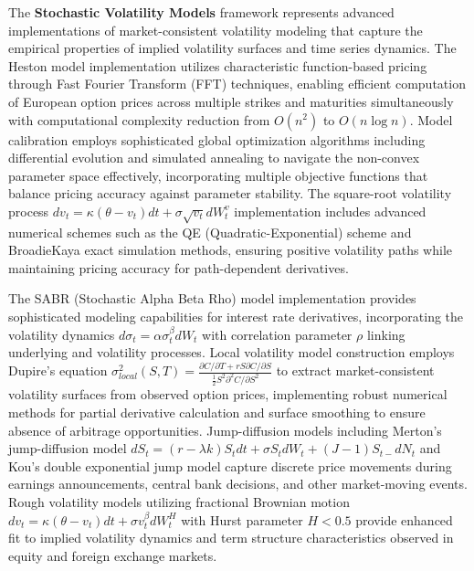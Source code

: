 \documentclass[12pt,a4paper]{article}
\theoremstyle{definition}
\theoremstyle{remark}
\begin{document}
The \textbf{Stochastic Volatility Models} framework represents advanced implementations of market-consistent volatility modeling that capture the empirical properties of implied volatility surfaces and time series dynamics. The Heston model implementation utilizes characteristic function-based pricing through Fast Fourier Transform (FFT) techniques, enabling efficient computation of European option prices across multiple strikes and maturities simultaneously with computational complexity reduction from $O(n^2)$ to $O(n \log n)$. Model calibration employs sophisticated global optimization algorithms including differential evolution and simulated annealing to navigate the non-convex parameter space effectively, incorporating multiple objective functions that balance pricing accuracy against parameter stability. The square-root volatility process $dv_t = \kappa(\theta - v_t)dt + \sigma \sqrt{v_t}dW_t^v$ implementation includes advanced numerical schemes such as the QE (Quadratic-Exponential) scheme and BroadieKaya exact simulation methods, ensuring positive volatility paths while maintaining pricing accuracy for path-dependent derivatives.

The SABR (Stochastic Alpha Beta Rho) model implementation provides sophisticated modeling capabilities for interest rate derivatives, incorporating the volatility dynamics $d\sigma_t = \alpha \sigma_t^\beta dW_t$ with correlation parameter $\rho$ linking underlying and volatility processes. Local volatility model construction employs Dupire's equation $\sigma_{local}^2(S,T) = \frac{\partial C/\partial T + rS\partial C/\partial S}{\frac{1}{2}S^2\partial^2 C/\partial S^2}$ to extract market-consistent volatility surfaces from observed option prices, implementing robust numerical methods for partial derivative calculation and surface smoothing to ensure absence of arbitrage opportunities. Jump-diffusion models including Merton's jump-diffusion model $dS_t = (r-\lambda k)S_t dt + \sigma S_t dW_t + (J-1)S_{t-}dN_t$ and Kou's double exponential jump model capture discrete price movements during earnings announcements, central bank decisions, and other market-moving events. Rough volatility models utilizing fractional Brownian motion $dv_t = \kappa(\theta - v_t)dt + \sigma v_t^\beta dW_t^H$ with Hurst parameter $H < 0.5$ provide enhanced fit to implied volatility dynamics and term structure characteristics observed in equity and foreign exchange markets.
\end{document}

